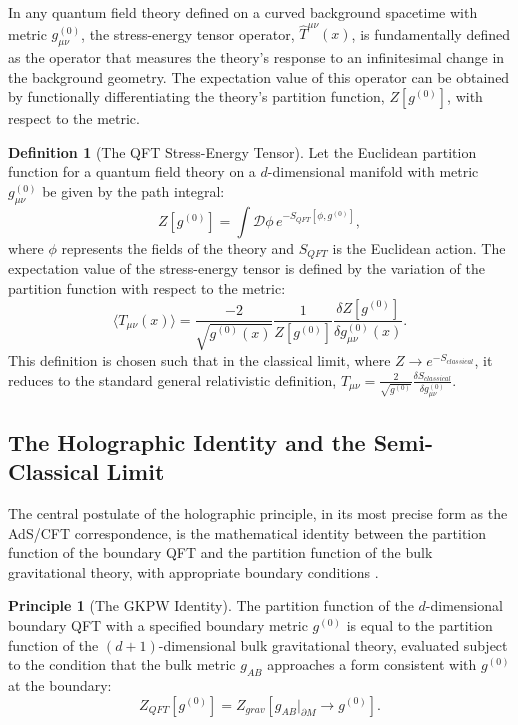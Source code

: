 \documentclass[11pt, letterpaper]{report}
\theoremstyle{plain} %
\theoremstyle{definition} %
\newtheorem{definition}{Definition}[chapter]
\newtheorem{principle}{Principle}[chapter]
\theoremstyle{remark} %
\newcommand{\BulkM}{M}
\newcommand{\BoundaryM}{\partial\BulkM}
\begin{document}
In any quantum field theory defined on a curved background spacetime with metric $g^{(0)}_{\mu\nu}$, the stress-energy tensor operator, $\hat{T}^{\mu\nu}(x)$, is fundamentally defined as the operator that measures the theory's response to an infinitesimal change in the background geometry. The expectation value of this operator can be obtained by functionally differentiating the theory's partition function, $Z[g^{(0)}]$, with respect to the metric.

\begin{definition}[The QFT Stress-Energy Tensor]
Let the Euclidean partition function for a quantum field theory on a $d$-dimensional manifold with metric $g^{(0)}_{\mu\nu}$ be given by the path integral:
\begin{equation}
    Z[g^{(0)}] = \int \mathcal{D}\phi \, e^{-S_{QFT}[\phi, g^{(0)}]},
\end{equation}
where $\phi$ represents the fields of the theory and $S_{QFT}$ is the Euclidean action. The expectation value of the stress-energy tensor is defined by the variation of the partition function with respect to the metric:
\begin{equation}
    \langle T_{\mu\nu}(x) \rangle = \frac{-2}{\sqrt{g^{(0)}(x)}} \frac{1}{Z[g^{(0)}]} \frac{\delta Z[g^{(0)}]}{\delta g^{(0)}_{\mu\nu}(x)}.
    \label{eq:tmn_from_Z}
\end{equation}
This definition is chosen such that in the classical limit, where $Z \to e^{-S_{classical}}$, it reduces to the standard general relativistic definition, $T_{\mu\nu} = \frac{2}{\sqrt{g^{(0)}}} \frac{\delta S_{classical}}{\delta g^{(0)}_{\mu\nu}}$.
\end{definition}

\subsection{The Holographic Identity and the Semi-Classical Limit}

The central postulate of the holographic principle, in its most precise form as the AdS/CFT correspondence, is the mathematical identity between the partition function of the boundary QFT and the partition function of the bulk gravitational theory, with appropriate boundary conditions \cite{Gubser1998GaugeTheory, Witten1998AntiDeSitter}.
\begin{principle}[The GKPW Identity]
\label{principle:gkpw}
The partition function of the $d$-dimensional boundary QFT with a specified boundary metric $g^{(0)}$ is equal to the partition function of the $(d+1)$-dimensional bulk gravitational theory, evaluated subject to the condition that the bulk metric $g_{AB}$ approaches a form consistent with $g^{(0)}$ at the boundary:
\begin{equation}
    Z_{QFT}[g^{(0)}] = Z_{grav}[g_{AB}|_{\BoundaryM} \to g^{(0)}].
\end{equation}
\end{principle}
\end{document}
